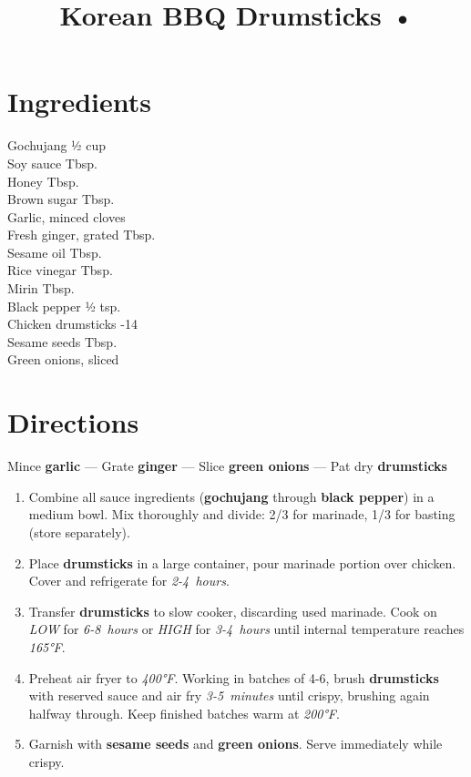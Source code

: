 \documentclass[11pt,letterpaper]{article}
\title{Korean BBQ Drumsticks •}
\author{}
\date{}
\begin{document}
\maketitle
\thispagestyle{empty}

\section*{Ingredients}
\setlength{\columnsep}{20pt}
\begin{multicols}{2}
\noindent
    Gochujang \dotfill ½ cup \\
    Soy sauce  Tbsp. \\
    Honey  Tbsp. \\
    Brown sugar  Tbsp. \\
    Garlic, minced  cloves \\
    Fresh ginger, grated  Tbsp. \\
    Sesame oil  Tbsp. \\
    Rice vinegar  Tbsp. \\
    \columnbreak
    Mirin  Tbsp. \\
    Black pepper \dotfill ½ tsp. \\
    Chicken drumsticks -14 \\
    Sesame seeds  Tbsp. \\
    Green onions, sliced  \\
\end{multicols}

\section*{Directions}

\noindent
Mince \textbf{garlic} ---
Grate \textbf{ginger} ---
Slice \textbf{green onions} ---
Pat dry \textbf{drumsticks}

\begin{enumerate}
    \item Combine all sauce ingredients (\textbf{gochujang} through \textbf{black pepper}) in a medium bowl. Mix thoroughly and divide: 2/3 for marinade, 1/3 for basting (store separately).
    
    \item Place \textbf{drumsticks} in a large container, pour marinade portion over chicken. Cover and refrigerate for \textit{2-4~hours}.
    
    \item Transfer \textbf{drumsticks} to slow cooker, discarding used marinade. Cook on \textit{LOW} for \textit{6-8~hours} or \textit{HIGH} for \textit{3-4~hours} until internal temperature reaches \textit{165°F}.
    
    \item Preheat air fryer to \textit{400°F}. Working in batches of 4-6, brush \textbf{drumsticks} with reserved sauce and air fry \textit{3-5~minutes} until crispy, brushing again halfway through. Keep finished batches warm at \textit{200°F}.
    
    \item Garnish with \textbf{sesame seeds} and \textbf{green onions}. Serve immediately while crispy.
\end{enumerate}
\end{document}
